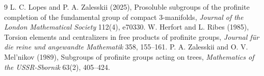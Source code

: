 \documentclass[11pt]{article}
\begin{document}

\begin{thebibliography}{9}
 L. C. Lopes and P. A. Zalesskii (2025), Prosoluble subgroups of the profinite completion of the fundamental group of compact 3-manifolds, \emph{Journal of the London Mathematical Society} 112(4), e70330.
 W. Herfort and L. Ribes (1985), Torsion elements and centralizers in free products of profinite groups, \emph{Journal f\"ur die reine und angewandte Mathematik} 358, 155--161.
 P. A. Zalesskii and O. V. Mel'nikov (1989), Subgroups of profinite groups acting on trees, \emph{Mathematics of the USSR-Sbornik} 63(2), 405--424.
\end{thebibliography}
\end{document}
